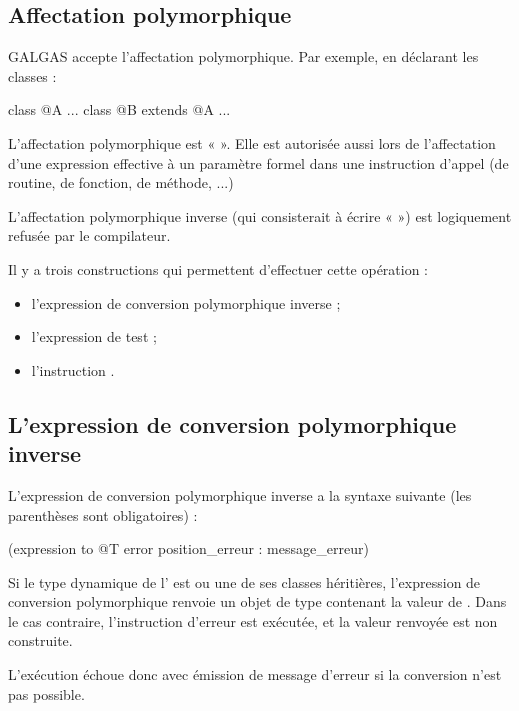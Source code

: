 \subsection{Affectation polymorphique}

GALGAS accepte l'affectation polymorphique. Par exemple, en déclarant les classes :

\begin{galgascode}
class @A { ... }
class @B extends @A { ... }
\end{galgascode}
 

L'affectation polymorphique est «  ». Elle est autorisée aussi lors de l'affectation d'une expression effective à un paramètre formel dans une instruction d'appel (de routine, de fonction, de méthode, ...)

L'affectation polymorphique inverse (qui consisterait à écrire «  ») est logiquement refusée par le compilateur.

Il y a trois constructions qui permettent d'effectuer cette opération :
\begin{itemize}
  \item l'expression de conversion polymorphique inverse ;
  \item l'expression de test ;
  \item l'instruction .
\end{itemize}

\subsection{L'expression de conversion polymorphique inverse}

L'expression de conversion polymorphique inverse a la syntaxe suivante (les parenthèses sont obligatoires) :

\begin{galgascode}
(expression to @T error position_erreur : message_erreur)
\end{galgascode}

Si le type dynamique de l' est  ou une de ses classes héritières, l'expression de conversion polymorphique renvoie un objet de type  contenant la valeur de . Dans le cas contraire, l'instruction d'erreur est exécutée, et la valeur renvoyée est non construite.

L'exécution échoue donc avec émission de message d'erreur si la conversion n'est pas possible. 

